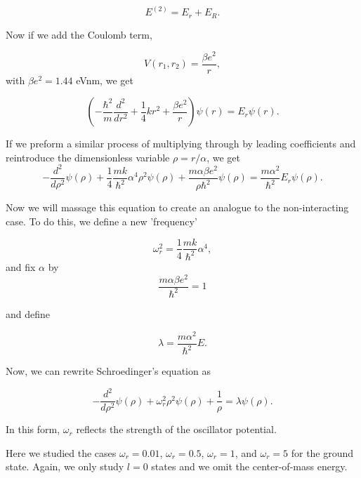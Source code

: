 \documentclass[%
oneside,                 %
final,                   %
10pt]{article}
\begin{document}
\begin{equation*}
E^{(2)}=E_r+E_R.
\end{equation*}

Now if we add the Coulomb term,

\begin{equation*}
V(r_1,r_2) =\frac{\beta e^2}{r},
\end{equation*}
with $\beta e^2=1.44$ eVnm, we get

\begin{equation*}
\left(  -\frac{\hbar^2}{m} \frac{d^2}{dr^2}+ \frac{1}{4}k r^2+\frac{\beta e^2}{r}\right)\psi(r)  = E_r \psi(r).
\end{equation*}

If we preform a similar process of multiplying through by leading coefficients and reintroduce the dimensionless variable $\rho = r/\alpha$, we get
\begin{equation*}
  -\frac{d^2}{d\rho^2} \psi(\rho) 
       + \frac{1}{4}\frac{mk}{\hbar^2} \alpha^4\rho^2\psi(\rho)+\frac{m\alpha \beta e^2}{\rho\hbar^2}\psi(\rho)  = 
\frac{m\alpha^2}{\hbar^2}E_r \psi(\rho) .
\end{equation*}

Now we will massage this equation to create an analogue to the non-interacting case.  To do this, we define a new 'frequency'

\begin{equation*}
\omega_r^2=\frac{1}{4}\frac{mk}{\hbar^2} \alpha^4,
\end{equation*}
and fix $\alpha$ by 
\begin{equation*}
\frac{m\alpha \beta e^2}{\hbar^2}=1
\end{equation*}

and define

\begin{equation*}
\lambda = \frac{m\alpha^2}{\hbar^2}E.
\end{equation*}

Now, we can rewrite Schroedinger's equation as

\begin{equation*}
  -\frac{d^2}{d\rho^2} \psi(\rho) + \omega_r^2\rho^2\psi(\rho) +\frac{1}{\rho} = \lambda \psi(\rho).
\end{equation*}

In this form, $\omega_r$ reflects the strength of the oscillator potential.

Here we studied the cases $\omega_r = 0.01$, $\omega_r = 0.5$, $\omega_r =1$,
and $\omega_r = 5$ for the ground state. Again, we only study $l=0$ states and we omit the center-of-mass energy.
\end{document}
